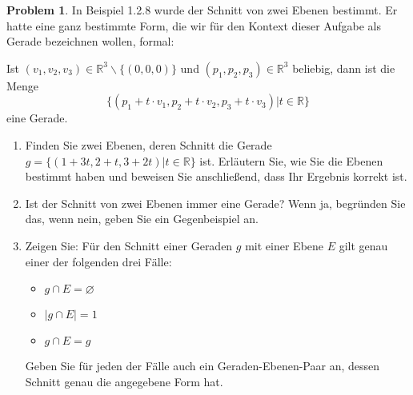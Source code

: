 \documentclass[prb,12pt]{revtex4-2}
\theoremstyle{definition}
\newtheorem{Problem}{Problem}
\theoremstyle{definition}
\newenvironment{parts}{\begin{enumerate}[label=(\alph*)]}{\end{enumerate}}
\newcommand{\R}{\mathbb{R}}
\begin{document}
\begin{Problem}
	In Beispiel 1.2.8 wurde der Schnitt von zwei Ebenen bestimmt. Er hatte eine ganz bestimmte Form, die wir für den Kontext dieser Aufgabe als Gerade bezeichnen wollen, formal:
	
	Ist $(v_1 , v_2, v_3) \in \R^3 \backslash \{(0, 0, 0)\}$ und $(p_1 , p_2 , p_3 ) \in \R^3$ beliebig, dann ist die Menge
	\[\{(p_1 + t \cdot v_1, p_2 + t \cdot v_2 , p_3 + t \cdot v_3 )|t \in \R\}\]
	eine Gerade.
	\begin{parts}
		\item  Finden Sie zwei Ebenen, deren Schnitt die Gerade $g = \{(1 + 3t, 2 + t, 3 + 2t)|t \in \R\}$ ist. Erläutern Sie, wie Sie die Ebenen bestimmt haben und beweisen Sie anschließend, dass Ihr Ergebnis korrekt ist.
		\item Ist der Schnitt von zwei Ebenen immer eine Gerade? Wenn ja, begründen Sie das, wenn nein, geben Sie ein Gegenbeispiel an.
		\item Zeigen Sie: Für den Schnitt einer Geraden $g$ mit einer Ebene $E$ gilt genau einer der folgenden drei Fälle:
		\begin{itemize}
			\item $g\cap E=\varnothing$ 
			\item $|g\cap E|=1$ 
			\item $g\cap E=g$
		\end{itemize}
		Geben Sie für jeden der Fälle auch ein Geraden-Ebenen-Paar an, dessen Schnitt genau die angegebene Form hat.
	\end{parts}
\end{Problem}
\end{document}
